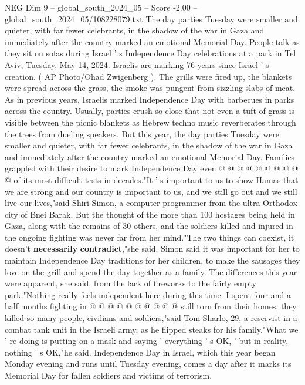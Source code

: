 \begin{textsample}{NEG Dim 9 – global\_south\_2024\_05 – Score -2.00 – global\_south\_2024\_05/108228079.txt}  \label{ex:f9_neg_328}
The day parties Tuesday were smaller and quieter, with far fewer celebrants, in the shadow of the war in Gaza and immediately after the country marked an emotional Memorial Day.
People talk as they sit on sofas during Israel ' s Independence Day celebrations at a park in Tel Aviv, Tuesday, May 14, 2024.
Israelis are marking 76 years since Israel ' s creation. ( AP Photo/Ohad Zwigenberg ).
The grills were fired up, the blankets were spread across the grass, the smoke was pungent from sizzling slabs of meat.
As in previous years, Israelis marked Independence Day with barbecues in parks across the country.
Usually, parties crush so close that not even a tuft of grass is visible between the picnic blankets as Hebrew techno music reverberates through the trees from dueling speakers.
But this year, the day parties Tuesday were smaller and quieter, with far fewer celebrants, in the shadow of the war in Gaza and immediately after the country marked an emotional Memorial Day.
Families grappled with their desire to mark Independence Day even @ @ @ @ @ @ @ @ @ @ of its most difficult tests in decades."It ' s important to us to show Hamas that we are strong and our country is important to us, and we still go out and we still live our lives,"said Shiri Simon, a computer programmer from the ultra-Orthodox city of Bnei Barak.
But the thought of the more than 100 hostages being held in Gaza, along with the remains of 30 others, and the soldiers killed and injured in the ongoing fighting was never far from her mind."The two things can coexist, it doesn't \textbf{necessarily} \textbf{contradict},"she said.
Simon said it was important for her to maintain Independence Day traditions for her children, to make the sausages they love on the grill and spend the day together as a family.
The differences this year were apparent, she said, from the lack of fireworks to the fairly empty park."Nothing really feels independent here during this time.
I spent four and a half months fighting in @ @ @ @ @ @ @ @ @ @ still torn from their homes, they killed so many people, civilians and soldiers,"said Tom Sharlo, 29, a reservist in a combat tank unit in the Israeli army, as he flipped steaks for his family."What we ' re doing is putting on a mask and saying ' everything ' s OK, ' but in reality, nothing ' s OK,"he said.
Independence Day in Israel, which this year began Monday evening and runs until Tuesday evening, comes a day after it marks its Memorial Day for fallen soldiers and victims of terrorism.

\end{textsample}
